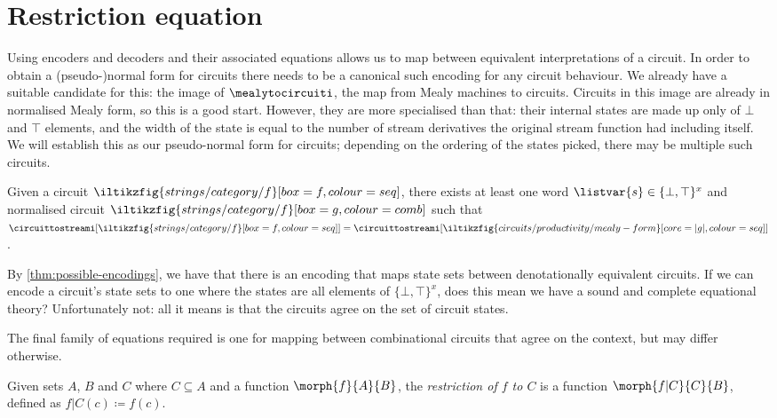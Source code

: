 \section{Restriction equation}

Using encoders and decoders and their associated equations allows us to map
between equivalent interpretations of a circuit.
In order to obtain a (pseudo-)normal form for circuits there needs to be a
canonical such encoding for any circuit behaviour.
We already have a suitable candidate for this: the image of
\(\mealytocircuiti\), the map from Mealy machines to circuits.
Circuits in this image are already in normalised Mealy form, so this is a good
start.
However, they are more specialised than that: their internal states are made up
only of \(\bot\) and \(\top\) elements, and the width of the state is equal to
the number of stream derivatives the original stream function had including
itself.
We will establish this as our pseudo-normal form for circuits; depending on the
ordering of the states picked, there may be multiple such circuits.

\begin{corollary}
    Given a circuit \(
    \iltikzfig{strings/category/f}[box=f,colour=seq]
    \), there exists at least one word \(\listvar{s} \in \{\bot,\top\}^x\) and
    normalised circuit \(
    \iltikzfig{strings/category/f}[box=g,colour=comb]
    \) such that \(
    \circuittostreami[\iltikzfig{strings/category/f}[box=f,colour=seq]]
    =
    \circuittostreami[\iltikzfig{circuits/productivity/mealy-form}[core=|g|,colour=seq]]
    \).
\end{corollary}

By \cref{thm:possible-encodings}, we have that there is an encoding that maps
state sets between denotationally equivalent circuits.
If we can encode a circuit's state sets to one where the states are all elements
of \(\{\bot,\top\}^x\), does this mean we have a sound and complete equational
theory?
Unfortunately not: all it means is that the circuits agree on the set of
circuit states.

\begin{example}
\end{example}

The final family of equations required is one for mapping between combinational
circuits that agree on the context, but may differ otherwise.

\begin{notation}
    Given sets \(A\), \(B\) and \(C\) where \(C \subseteq A\) and a function
    \(\morph{f}{A}{B}\), the \emph{restriction of \(f\) to \(C\)} is a function
    \(\morph{f|C}{C}{B}\), defined as \(f|C(c) \coloneqq f(c)\).
\end{notation}

